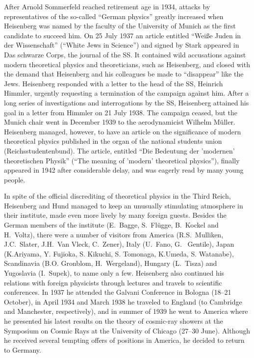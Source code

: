 \documentclass{article}
\begin{document}
After Arnold Sommerfeld reached retirement age in 1934, attacks by representatives of the so-called “German physics” greatly increased when Heisenberg was named by the faculty of the University of Munich as the first candidate to succeed him. On 25 July 1937 an article entitled “Weiße Juden in der Wissenschaft” (“White Jews in Science”) and signed by Stark appeared in Das schwarze Corps, the journal of the SS. It contained wild accusations against modern theoretical physics and theoreticians, such as Heisenberg, and closed with the demand that Heisenberg and his colleagues be made to “disappear” like the Jews. Heisenberg responded with a letter to the head of the SS, Heinrich Himmler, urgently requesting a termination of the campaign against him. After a long series of investigations and interrogations by the SS, Heisenberg attained his goal in a letter from Himmler on 21 July 1938. The campaign ceased, but the Munich chair went in December 1939 to the aerodynamicist Wilhelm Müller. Heisenberg managed, however, to have an article on the significance of modern theoretical physics published in the organ of the national students union (Reichsstudentenbund). The article, entitled “Die Bedeutung der 'modernen' theoretischen Physik” (“The meaning of 'modern' theoretical physics”), finally appeared in 1942 after considerable delay, and was eagerly read by many young people.

In spite of the official discrediting of theoretical physics in the Third Reich, Heisenberg and Hund managed to keep an unusually stimulating atmosphere in their institute, made even more lively by many foreign guests. Besides the German members of the institute (E.~Bagge, S.~Flügge, B.~Kockel and H.~Voltz), there were a number of visitors from America (R.S.~Mulliken, J.C.~Slater, J.H.~Van Vleck, C.~Zener), Italy (U.~Fano, G.~ Gentile), Japan (K.Ariyama, Y. Fujioka, S. Kikuchi, S. Tomonaga, K.Umeda, S. Watanabe), Scandinavia (B.O. Gronblom, H.~Wergeland), Hungary (L.~Tisza) and Yugoslavia (I.~Supek), to name only a few. Heisenberg also continued his relations with foreign physicists through lectures and travels to scientific conferences. In 1937 he attended the Galvani Conference in Bologna (18--21 October), in April 1934 and March 1938 he traveled to England (to Cambridge and Manchester, respectively), and in summer of 1939 he went to America where he presented his latest results on the theory of cosmic-ray showers at the Symposium on Cosmic Rays at the University of Chicago (27--30 June). Although he received several tempting offers of positions in America, he decided to return to Germany.
\end{document}
